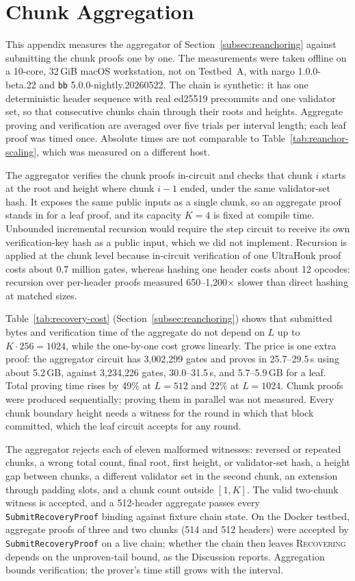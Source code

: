 \section{Chunk Aggregation}
\label{app:aggregation}

This appendix measures the aggregator of Section~\ref{subsec:reanchoring}
against submitting the chunk proofs one by one. The measurements were taken
offline on a 10-core, 32\,GiB macOS workstation, not on Testbed~A, with
nargo 1.0.0-beta.22 and \texttt{bb} 5.0.0-nightly.20260522. The chain is
synthetic: it has one deterministic header sequence with real ed25519
precommits and one validator set, so that consecutive chunks chain through
their roots and heights. Aggregate proving and verification are averaged over
five trials per interval length; each leaf proof was timed once. Absolute times
are not comparable to Table~\ref{tab:reanchor-scaling}, which was measured on a
different host.


The aggregator verifies the chunk proofs in-circuit and checks that chunk
$i$ starts at the root and height where chunk $i{-}1$ ended, under the same
validator-set hash. It exposes the same public inputs as a single chunk, so an
aggregate proof stands in for a leaf proof, and its capacity $K{=}4$ is fixed
at compile time. Unbounded incremental recursion would require the step circuit
to receive its own verification-key hash as a public input, which we did not
implement. Recursion is applied at the chunk level because in-circuit
verification of one UltraHonk proof costs about 0.7 million gates, whereas
hashing one header costs about 12 opcodes: recursion over per-header proofs
measured 650--1{,}200$\times$ slower than direct hashing at matched sizes.

Table~\ref{tab:recovery-cost} (Section~\ref{subsec:reanchoring}) shows that submitted bytes and verification time of
the aggregate do not depend on $L$ up to $K \cdot 256 = 1024$, while the
one-by-one cost grows linearly. The price is one extra proof: the aggregator
circuit has 3{,}002{,}299 gates and proves in 25.7--29.5\,s using about 5.2\,GB,
against 3{,}234{,}226 gates, 30.0--31.5\,s, and 5.7--5.9\,GB for a leaf. Total
proving time rises by 49\% at $L{=}512$ and 22\% at $L{=}1024$. Chunk proofs
were produced sequentially; proving them in parallel was not measured. Every
chunk boundary height needs a witness for the round in which that block committed,
which the leaf circuit accepts for any round.

The aggregator rejects each of eleven malformed witnesses: reversed or repeated
chunks, a wrong total count, final root, first height, or validator-set hash,
a height gap between chunks, a different validator set in the second chunk,
an extension through padding slots, and a chunk count outside $[1,K]$. The
valid two-chunk witness is accepted, and a 512-header aggregate passes every
\texttt{SubmitRecoveryProof} binding against fixture chain state. On the Docker
testbed, aggregate proofs of three and two chunks (514 and 512 headers) were
accepted by \texttt{SubmitRecoveryProof} on a live chain; whether the chain then
leaves \textsc{Recovering} depends on the unproven-tail bound, as the
Discussion reports. Aggregation bounds verification; the prover's time still
grows with the interval.

\FloatBarrier
